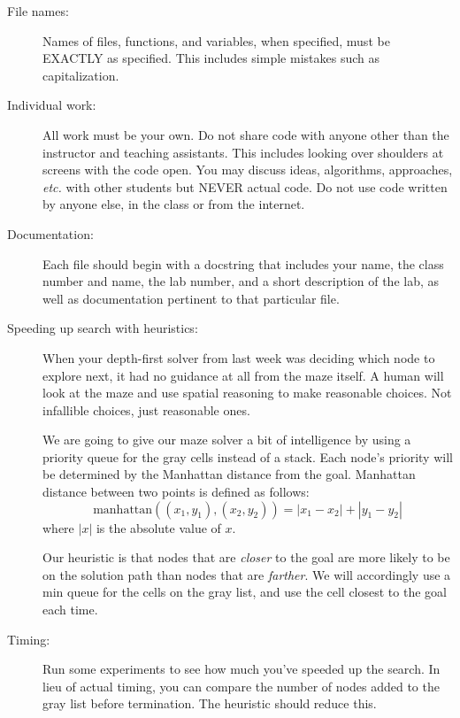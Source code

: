 \documentclass{article}
\begin{document}
\begin{description}

\item[File names:]  Names of files, functions, and variables, 
when specified,
must be EXACTLY as specified.  This includes simple mistakes such
as capitalization.

\item[Individual work:]  All work must be your own.  Do not share
code with anyone other than the instructor and teaching assistants.
This includes looking over shoulders at screens with the code open.
You may discuss ideas, algorithms, approaches, {\em etc.} with
other students but NEVER actual code.  Do not use code
written by anyone else, in the class or from the internet.

\item[Documentation:] Each file should begin with a docstring
that includes your name, the class number and name, the lab
number, and  
a short description of the lab, as well as documentation pertinent
to that particular file.

\item[Speeding up search with heuristics:]  When your depth-first
solver from last week was deciding which node to explore next,
it had no guidance at all from the maze itself.  A human will look
at the maze and use spatial reasoning to make reasonable
choices.  Not infallible choices, just reasonable ones.

We are going to give our maze solver a bit of intelligence by using
a priority queue for the gray cells instead of a stack.  Each node's
priority will be determined by the Manhattan distance from the goal.
Manhattan distance between two points is defined as follows:
\[
\mbox{manhattan}((x_1, y_1), (x_2, y_2)) =|x_1-x_2| + |y_1-y_2|
\]
where $|x|$ is the absolute value of $x$.

Our heuristic is that nodes that are {\em closer} to the goal are
more likely to be on the solution path than nodes that are {\em farther}.
We will accordingly use a min queue for the cells on the gray
list, and use the cell closest to the goal each time.

\item[Timing:]  Run some experiments to see how much you've
speeded up the search.  In lieu of actual timing, you can 
compare the number of nodes added to the gray list before
termination.  The heuristic should reduce this.

\end{description}
\end{document}
